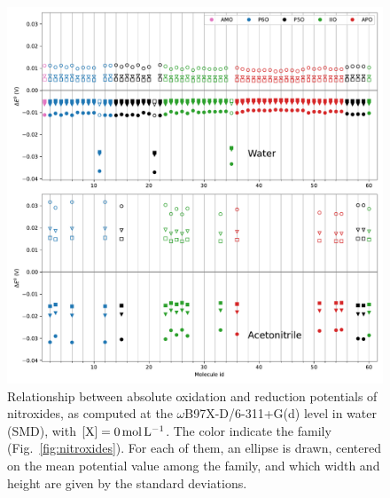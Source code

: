 \documentclass[review,preprint]{elsarticle}
\begin{document}
\begin{figure}[!h]
	\centering
	\includegraphics[width=.9\linewidth]{Figure8}
	\caption{Relationship between absolute oxidation and reduction potentials of nitroxides, as computed at the $\omega$B97X-D/6-311+G(d) level in water (SMD), with $[\ce{X}]=\SI{0}{\mole\per\liter}$. The color indicate the family (Fig.~\ref{fig:nitroxides}). For each of them, an ellipse is drawn, centered on the mean potential value among the family, and which width and height are given by the standard deviations.}
	\label{fig:family}
\end{figure}
\end{document}
